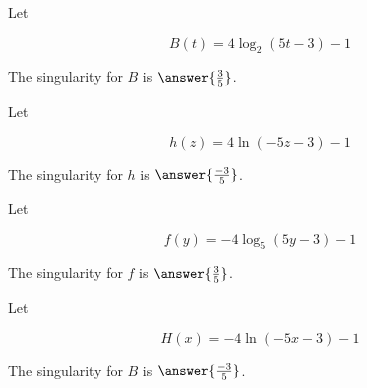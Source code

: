 \documentclass{ximera}
\author{Lee Wayand}
\begin{document}
\begin{exercise}


\begin{question}



Let 

\[
B(t) = 4 \log_{2}(5t - 3) - 1
\]



The singularity for $B$ is $\answer{\frac{3}{5}}$.

\end{question}







\begin{question}



Let 

\[
h(z) = 4 \ln(-5z - 3) - 1
\]


The singularity for $h$ is $\answer{\frac{-3}{5}}$.



\end{question}





\begin{question}



Let 

\[
f(y) = -4 \log_{5}(5y - 3) - 1
\]


The singularity for $f$ is $\answer{\frac{3}{5}}$.

\end{question}





\begin{question}



Let 

\[
H(x) = -4 \ln(-5x - 3) - 1
\]


The singularity for $B$ is $\answer{\frac{-3}{5}}$.

\end{question}








\end{exercise}
\end{document}
